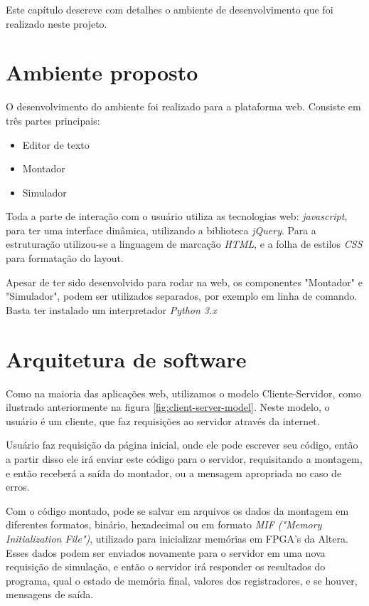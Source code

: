Este capítulo descreve com detalhes o ambiente de desenvolvimento que foi realizado neste projeto.

\section{Ambiente proposto}%

	O desenvolvimento do ambiente foi realizado para a plataforma web. Consiste em três partes principais:
	
	\begin{itemize}
		\item Editor de texto
		\item Montador
		\item Simulador
	\end{itemize}

	Toda a parte de interação com o usuário utiliza as tecnologias web: \textit{javascript}, para ter uma interface dinâmica, utilizando a biblioteca \textit{jQuery}. Para a estruturação utilizou-se a linguagem de marcação \textit{HTML}, e a folha de estilos \textit{CSS} para formatação do layout.

	Apesar de ter sido desenvolvido para rodar na web, os componentes "Montador" e "Simulador", podem ser utilizados separados, por exemplo em linha de comando. Basta ter instalado um interpretador \textit{Python 3.x}


\section{Arquitetura de software}

	Como na maioria das aplicações web, utilizamos o modelo Cliente-Servidor, como ilustrado anteriormente na figura \ref{fig:client-server-model}. Neste modelo, o usuário é um cliente, que faz requisições ao servidor através da internet. 

	Usuário faz requisição da página inicial, onde ele pode escrever seu código, então a partir disso ele irá enviar este código para o servidor, requisitando a montagem, e então receberá a saída do montador, ou a mensagem apropriada no caso de erros.

	Com o código montado, pode se salvar em arquivos os dados da montagem em diferentes formatos, binário, hexadecimal ou em formato \textit{MIF ("Memory Initialization File")}, utilizado para inicializar memórias em FPGA's da Altera. Esses dados podem ser enviados novamente para o servidor em uma nova requisição de simulação, e então o servidor irá responder os resultados do programa, qual o estado de memória final, valores dos registradores, e se houver, mensagens de saída.

